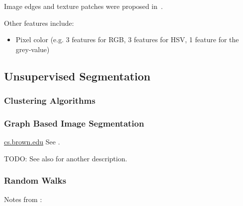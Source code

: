 Image edges and texture patches were proposed in~\cite{brox2011object}.

Other features include:

\begin{itemize}
    \item Pixel color (e.g. 3 features for RGB, 3 features for HSV, 1 feature
          for the grey-value)
\end{itemize}


\subsection{Unsupervised Segmentation}%
\label{subsec:unsupervised-traditional-segmentation}%

\subsubsection{Clustering Algorithms}
%




\subsubsection{Graph Based Image Segmentation}%
\label{subsec:graph-based-image-segmentation}%
\href{http://cs.brown.edu/~pff/segment/}{cs.brown.edu}
See \cite{felzenszwalb2004efficient}.

TODO: See also \cite{pantofaru2005comparison} for another description.


\subsubsection{Random Walks}
Notes from \cite{meilpa2001learning}:

